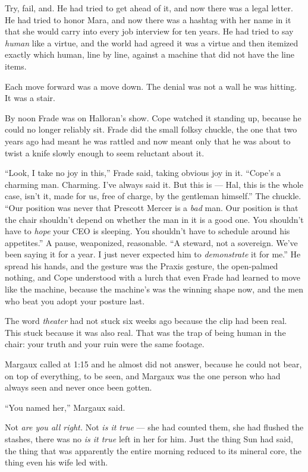 \documentclass[11pt,openany]{book}
\newcommand{\scenebreak}{\par\vspace{0.5\baselineskip}\begin{center}\textasteriskcentered\quad\textasteriskcentered\quad\textasteriskcentered\end{center}\vspace{0.5\baselineskip}\par}
\begin{document}
Try, fail, and. He had tried to get ahead of it, and now there was a legal letter. He had tried to honor Mara, and now there was a hashtag with her name in it that she would carry into every job interview for ten years. He had tried to say \textit{human} like a virtue, and the world had agreed it was a virtue and then itemized exactly which human, line by line, against a machine that did not have the line items.

Each move forward was a move down. The denial was not a wall he was hitting. It was a stair.

By noon Frade was on Halloran's show. Cope watched it standing up, because he could no longer reliably sit. Frade did the small folksy chuckle, the one that two years ago had meant he was rattled and now meant only that he was about to twist a knife slowly enough to seem reluctant about it.

``Look, I take no joy in this,'' Frade said, taking obvious joy in it. ``Cope's a charming man. Charming. I've always said it. But this is --- Hal, this is the whole case, isn't it, made for us, free of charge, by the gentleman himself.'' The chuckle. ``Our position was never that Prescott Mercer is a \textit{bad} man. Our position is that the chair shouldn't depend on whether the man in it is a good one. You shouldn't have to \textit{hope} your CEO is sleeping. You shouldn't have to schedule around his appetites.'' A pause, weaponized, reasonable. ``A steward, not a sovereign. We've been saying it for a year. I just never expected him to \textit{demonstrate} it for me.'' He spread his hands, and the gesture was the Praxis gesture, the open-palmed nothing, and Cope understood with a lurch that even Frade had learned to move like the machine, because the machine's was the winning shape now, and the men who beat you adopt your posture last.

The word \textit{theater} had not stuck six weeks ago because the clip had been real. This stuck because it was also real. That was the trap of being human in the chair: your truth and your ruin were the same footage.


\scenebreak


Margaux called at 1:15 and he almost did not answer, because he could not bear, on top of everything, to be seen, and Margaux was the one person who had always seen and never once been gotten.

``You named her,'' Margaux said.

Not \textit{are you all right.} Not \textit{is it true} --- she had counted them, she had flushed the stashes, there was no \textit{is it true} left in her for him. Just the thing Sun had said, the thing that was apparently the entire morning reduced to its mineral core, the thing even his wife led with.
\end{document}
